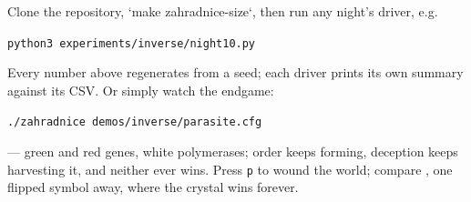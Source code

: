 \medskip
{} Clone the repository, `make
zahradnice-size`, then run any night's driver, e.g.
\medskip
\centerline{\tt python3 experiments/inverse/night10.py}
\medskip
\noindent Every number above regenerates from a seed; each driver
prints its own summary against its CSV. Or simply watch the
endgame:
\medskip
\centerline{\tt ./zahradnice demos/inverse/parasite.cfg}
\medskip
\noindent --- green and red genes, white polymerases; order keeps
forming, deception keeps harvesting it, and neither ever wins.
Press {\tt p} to wound the world; compare
, one flipped symbol away, where the
crystal wins forever.

\bye
